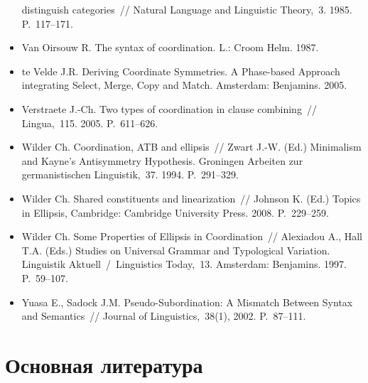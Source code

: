\begin{itemize}
        distinguish categories~// Natural Language and Linguistic Theory,~3.
        1985. P.~117--171.
  \item
        Van Oirsouw R. The syntax of coordination. L.: Croom Helm. 1987.
  \item
        te Velde J.R. Deriving Coordinate Symmetries. A Phase-based Approach
        integrating Select, Merge, Copy and Match. Amsterdam: Benjamins. 2005.
  \item
        Verstraete J.-Ch. Two types of coordination in clause combining~//
        Lingua,~115. 2005. P.~611--626.
  \item
        Wilder Ch. Coordination, ATB and ellipsis~// Zwart J.-W. (Ed.)
        Minimalism and Kayne's Antisymmetry Hypothesis. Groningen Arbeiten zur
        germanistischen Linguistik,~37. 1994. P.~291--329.
  \item
        Wilder Ch. Shared constituents and linearization~// Johnson K. (Ed.)
        Topics in Ellipsis, Cambridge: Cambridge University Press. 2008.
        P.~229--259.
  \item
        Wilder Ch. Some Properties of Ellipsis in Coordination~// Alexiadou
        A., Hall T.A. (Eds.) Studies on Universal Grammar and Typological
        Variation. Linguistik Aktuell~/~Linguistics Today,~13. Amsterdam:
        Benjamins. 1997. P.~59--107.
  \item
        Yuasa E., Sadock J.M. Pseudo-Subordination: A Mismatch Between Syntax
        and Semantics~// Journal of Linguistics,~38(1), 2002. P.~87--111.
\end{itemize}

\section*{Основная литература}\label{ux43eux441ux43dux43eux432ux43dux430ux44f-ux43bux438ux442ux435ux440ux430ux442ux443ux440ux430}

